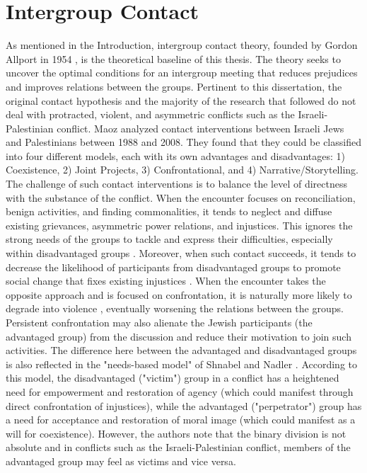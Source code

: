 \documentclass[dissertation,math,vertlayout,pdfa,colorlinks,nologo]{aaltoseries}
\begin{document}
\pagebreak

\section{Intergroup Contact}
As mentioned in the Introduction, intergroup contact theory, founded by Gordon Allport in 1954 \cite{allportNaturePrejudice1954}, is the theoretical baseline of this thesis. The theory seeks to uncover the optimal conditions for an intergroup meeting that reduces prejudices and improves relations between the groups. Pertinent to this dissertation, the original contact hypothesis and the majority of the research that followed do not deal with protracted, violent, and asymmetric conflicts such as the Israeli-Palestinian conflict. Maoz \cite{maozDoesContactWork2011} analyzed contact interventions between Israeli Jews and Palestinians between 1988 and 2008. They found that they could be classified into four different models, each with its own advantages and disadvantages: 1) Coexistence, 2) Joint Projects, 3) Confrontational, and 4) Narrative/Storytelling. The challenge of such contact interventions is to balance the level of directness with the substance of the conflict. When the encounter focuses on reconciliation, benign activities, and finding commonalities, it tends to neglect and diffuse existing grievances, asymmetric power relations, and injustices. This ignores the strong needs of the groups to tackle and express their difficulties, especially within disadvantaged groups \cite{maozMultipleConflictsCompeting2000,shnabelNeedsbasedModelReconciliation2008}. Moreover, when such contact succeeds, it tends to decrease the likelihood of participants from disadvantaged groups to promote social change that fixes existing injustices \cite{durrheimIntergroupContactStruggle2018, dixonOptimalContactStrategy2005, albzourTalkingSegregationWall2022, bekermanRethinkingIntergroupEncounters2007}. When the encounter takes the opposite approach and is focused on confrontation, it is naturally more likely to degrade into violence \cite{maozTheyUnderstandOnly2007}, eventually worsening the relations between the groups. Persistent confrontation may also alienate the Jewish participants (the advantaged group) from the discussion and reduce their motivation to join such activities. The difference here between the advantaged and disadvantaged groups is also reflected in the "needs-based model" of Shnabel and Nadler \cite{shnabelNeedsbasedModelReconciliation2008,nadlerIntergroupReconciliationInstrumental2015, shnabelChapterFourNeedsbased2023}. According to this model, the disadvantaged ("victim") group in a conflict has a heightened need for empowerment and restoration of agency (which could manifest through direct confrontation of injustices), while the advantaged ("perpetrator") group has a need for acceptance and restoration of moral image (which could manifest as a will for coexistence). However, the authors note that the binary division is not absolute and in conflicts such as the Israeli-Palestinian conflict, members of the advantaged group may feel as victims and vice versa.
\end{document}
